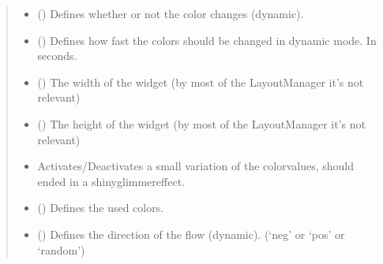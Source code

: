 \documentclass[letterpaper,10pt,english]{sphinxmanual}
\begin{document}
\begin{fulllineitems}
\begin{quote}
\begin{description}
\begin{itemize}
\item {} 
\sphinxAtStartPar
{} (\sphinxstyleliteralemphasis{\sphinxupquote{, }}) \textendash{} Defines whether or not the color changes (dynamic).

\item {} 
\sphinxAtStartPar
{} (\sphinxstyleliteralemphasis{\sphinxupquote{, }}) \textendash{} Defines how fast the colors should be changed in dynamic mode. In seconds.

\item {} 
\sphinxAtStartPar
{} (\sphinxstyleliteralemphasis{\sphinxupquote{, }}) \textendash{} The width of the widget (by most of the LayoutManager it’s not relevant)

\item {} 
\sphinxAtStartPar
{} (\sphinxstyleliteralemphasis{\sphinxupquote{, }}) \textendash{} The height of the widget (by most of the LayoutManager it’s not relevant)

\item {} 
\sphinxAtStartPar
{} \textendash{} Activates/Deactivates a small variation of the color\sphinxhyphen{}values, should ended in a shiny\sphinxhyphen{}glimmer\sphinxhyphen{}effect.

\item {} 
\sphinxAtStartPar
{} (\sphinxstyleliteralemphasis{\sphinxupquote{, }}) \textendash{} Defines the used colors.

\item {} 
\sphinxAtStartPar
{} (\sphinxstyleliteralemphasis{\sphinxupquote{, }}) \textendash{} Defines the direction of the flow (dynamic). (‘neg’ or ‘pos’ or ‘random’)


\end{itemize}
\end{description}
\end{quote}
\end{fulllineitems}
\end{document}
